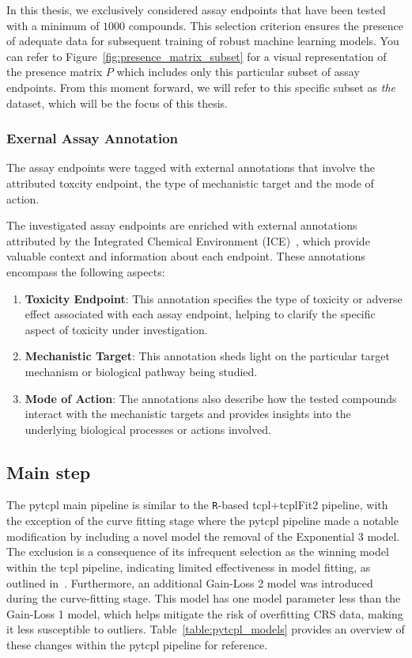 In this thesis, we exclusively considered assay endpoints that have been tested with a minimum of $\num{1000}$ compounds. This selection criterion ensures the presence of adequate data for subsequent training of robust machine learning models. You can refer to Figure~\ref{fig:presence_matrix_subset} for a visual representation of the presence matrix $P$ which includes only this particular subset of assay endpoints. From this moment forward, we will refer to this specific subset as \emph{the} dataset, which will be the focus of this thesis. 

\subsubsection{Exernal Assay Annotation}
The assay endpoints were tagged with external annotations that involve the attributed toxcity endpoint, the type of mechanistic target and the mode of action.

The investigated assay endpoints are enriched with external annotations attributed by the Integrated Chemical Environment (ICE)~\cite{ice2022}, which provide valuable context and information about each endpoint. These annotations encompass the following aspects:

\begin{enumerate}
    \item \textbf{Toxicity Endpoint}: This annotation specifies the type of toxicity or adverse effect associated with each assay endpoint, helping to clarify the specific aspect of toxicity under investigation.
    
    \item \textbf{Mechanistic Target}: This annotation sheds light on the particular target mechanism or biological pathway being studied.
    
    \item \textbf{Mode of Action}: The annotations also describe how the tested compounds interact with the mechanistic targets and provides insights into the underlying biological processes or actions involved.
\end{enumerate}

\subsection{Main step}
The pytcpl main pipeline is similar to the \texttt{R}-based tcpl+tcplFit2 pipeline, with the exception of the curve fitting stage where the pytcpl pipeline made a notable modification by including a novel model the removal of the Exponential 3 model. The exclusion is a consequence of its infrequent selection as the winning model within the tcpl pipeline, indicating limited effectiveness in model fitting, as outlined in~\cite{feshuk2023}. Furthermore, an additional Gain-Loss 2 model was introduced during the curve-fitting stage. This model has one model parameter less than the Gain-Loss 1 model, which helps mitigate the risk of overfitting CRS data, making it less susceptible to outliers. Table~\ref{table:pytcpl_models} provides an overview of these changes within the pytcpl pipeline for reference.

